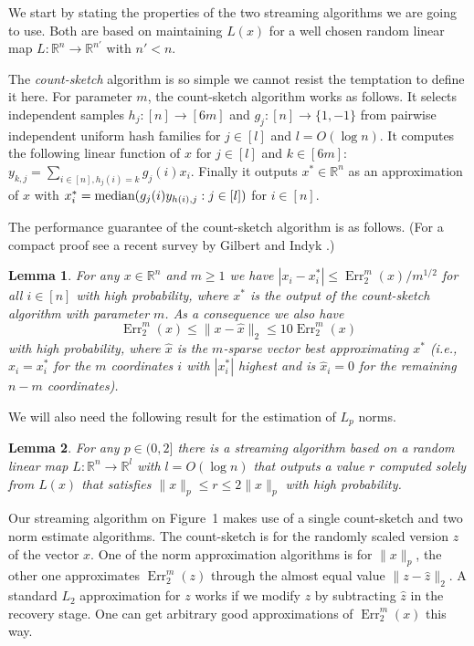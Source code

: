 \documentclass[9pt,letterpaper]{article}
\newtheorem{lemma}{Lemma}
\theoremstyle{remark}
\DeclareMathOperator{\err}{Err}
\begin{document}
We start by stating the properties of the two streaming algorithms we are
going to use. Both are based on maintaining $L(x)$
for a well chosen random linear map
$L:\mathbb R^n\to\mathbb R^{n'}$ with $n'<n$.

The {\em count-sketch} algorithm \cite{CharikarCF04} is so simple we cannot resist the
temptation to define it here. For parameter $m$, the count-sketch algorithm
works as follows. It selects independent samples $h_j:[n]\to[6m]$ and
$g_j:[n]\to\{1,-1\}$ from pairwise independent uniform hash families for
$j\in[l]$ and $l=O(\log n)$. It computes the following linear function of $x$
for $j\in[l]$ and $k\in[6m]$:
$y_{k,j}=\sum_{i\in[n],h_j(i)=k}g_j(i)x_i$. Finally it outputs
$x^*\in\mathbb R^n$ as an approximation of $x$ with
$x^*_i=\hbox{median}(g_j(i)y_{h(i),j}:j\in[l])$ for $i\in[n]$.

The performance guarantee of the count-sketch algorithm is as follows.
(For a compact proof see a recent survey by Gilbert and Indyk \cite{GilbertI10}.) 

\begin{lemma}\label{c-s}{\rm\cite{CharikarCF04}}
For any $x\in\mathbb R^n$ and $m\ge1$ we have
$|x_i-x^*_i|\le\err_2^m(x)/m^{1/2}$
for all $i\in[n]$ with high probability,
where $x^*$ is the output of the count-sketch algorithm with parameter $m$.
As a consequence we also have
$$\err_2^m(x)\le\|x-\hat x\|_2\le10\err_2^m(x)$$
with high probability, where $\hat x$ is the
$m$-sparse vector best approximating $x^*$ (i.e., $\hat x_i=x^*_i$ for the
$m$ coordinates $i$ with $|x^*_i|$ highest and is $\hat x_i=0$ for the
remaining $n-m$ coordinates).
\end{lemma}

We will also need the following result for the estimation of $L_p$ norms.

\begin{lemma}\label{norm}{\rm\cite{KaneNW10}}
For any $p\in(0,2]$ there is a streaming algorithm based on a random linear
map $L:\mathbb R^n\to\mathbb R^l$ with $l=O(\log n)$ that outputs a value $r$
computed solely from $L(x)$ that satisfies
$\|x\|_p\le r\le2\|x\|_p$
with high probability.
\end{lemma}

Our streaming algorithm on Figure~1 makes use of a single count-sketch and two
norm estimate algorithms. The count-sketch is for the randomly scaled version
$z$ of the vector $x$. One of the norm approximation algorithms is for
$\|x\|_p$, the other one approximates $\err_2^m(z)$ through the almost equal
value $\|z-\hat z\|_2$. A standard $L_2$ approximation for $z$ works if we
modify $z$ by subtracting $\hat z$ in the recovery stage. One can get
arbitrary good approximations of $\err_2^m(x)$ this way.
\end{document}
